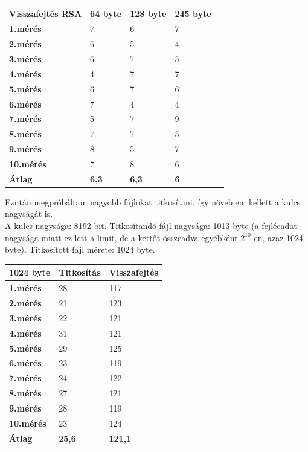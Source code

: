 \begin{center}
	\begin{tabular}{|p{2.4cm}|p{2cm}|p{2cm}|p{2cm}|p{2cm}|}
		\hline
		\textbf{Visszafejtés} \newline \textbf{RSA} & \textbf{64 byte} & \textbf{128 byte} & \textbf{245 byte}\\
		\hline
		\textbf{1.mérés} & 7 & 6 & 7\\
		\hline
		\textbf{2.mérés} & 6 & 5 & 4\\
		\hline
		\textbf{3.mérés} & 6 & 7 & 5\\
		\hline
		\textbf{4.mérés} & 4 & 7 & 7\\
		\hline
		\textbf{5.mérés} & 6 & 7 & 6\\
		\hline
		\textbf{6.mérés} & 7 & 4 & 4\\
		\hline
		\textbf{7.mérés} & 5 & 7 & 9\\
		\hline
		\textbf{8.mérés} & 7 & 7 & 5\\
		\hline
		\textbf{9.mérés} & 8 & 5 & 7\\
		\hline
		\textbf{10.mérés} & 7 & 8 & 6\\
		\hline
		\hline
		\textbf{Átlag} & \textbf{6,3} & \textbf{6,3} & \textbf{6}\\
		\hline
	\end{tabular}
\end{center}

Ezután megpróbáltam nagyobb fájlokat titkosítani, így növelnem kellett a kulcs nagyságát is.
\vspace{5pt} \\ A kulcs nagysága: 8192 bit. Titkosítandó fájl nagysága: 1013 byte (a fejlécadat nagysága miatt ez lett a limit, de a kettőt összeadva egyébként $2^{10}$-en, azaz 1024 byte). Titkosított fájl mérete: 1024 byte.

\begin{center}
	\begin{tabular}{|p{2.4cm}|p{2.4cm}|p{2.4cm}|}
		\hline
		\textbf{1024 byte} & \textbf{Titkosítás} & \textbf{Visszafejtés}\\
		\hline
		\textbf{1.mérés} & 28 & 117\\
		\hline
		\textbf{2.mérés} & 21 & 123\\
		\hline
		\textbf{3.mérés} & 22 & 121\\
		\hline
		\textbf{4.mérés} & 31 & 121\\
		\hline
		\textbf{5.mérés} & 29 & 125\\
		\hline
		\textbf{6.mérés} & 23 & 119\\
		\hline
		\textbf{7.mérés} & 24 & 122\\
		\hline
		\textbf{8.mérés} & 27 & 121\\
		\hline
		\textbf{9.mérés} & 28 & 119\\
		\hline
		\textbf{10.mérés} & 23 & 124\\
		\hline
		\hline
		\textbf{Átlag} & \textbf{25,6} & \textbf{121,1}\\
		\hline
	\end{tabular}
\end{center}


